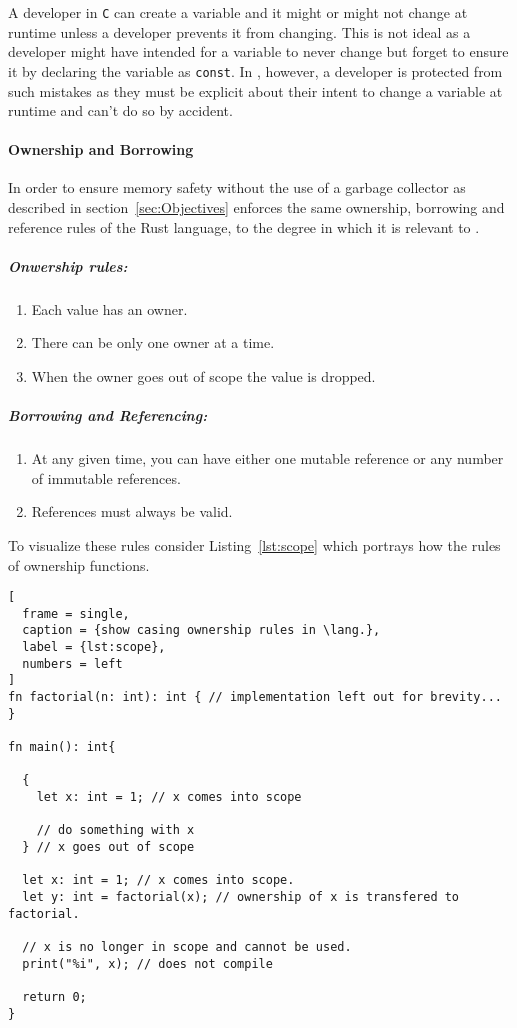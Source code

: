 A developer in \texttt{C} can create a variable and it might or might not change at
runtime unless a developer prevents it from changing. This is not ideal as a
developer might have intended for a variable to never change but forget to ensure it
by declaring the variable as \texttt{const}. In \lang, however, a developer is protected from
such mistakes as they must be explicit about their intent to change a variable at
runtime and can't do so by accident.

\paragraph{Ownership and Borrowing} \hfill 
\label{par:Onwership}

In order to ensure memory safety without the use of a garbage collector as described
in section~\ref{sec:Objectives} \lang{} enforces the same ownership, borrowing and
reference rules of the Rust language, to the degree in which it is relevant to \lang.

\subparagraph{Onwership rules:}
\begin{enumerate}
  \item Each value has an owner\cite{RUST}. 
  \item There can be only one owner at a time\cite{RUST}. 
  \item When the owner goes out of scope the value is dropped\cite{RUST}.
\end{enumerate}

\subparagraph{Borrowing and Referencing:}
\label{par:borrowing}

\begin{enumerate}
  \item At any given time, you can have either one mutable reference or any number of
    immutable references\cite{RUST}.
  \item References must always be valid\cite{RUST}.
\end{enumerate}

To visualize these rules consider Listing~\ref{lst:scope} which portrays how the
rules of ownership functions.

\newpage

\begin{lstlisting}[
  frame = single,
  caption = {show casing ownership rules in \lang.},
  label = {lst:scope},
  numbers = left
]
fn factorial(n: int): int { // implementation left out for brevity... }

fn main(): int{
  
  {
    let x: int = 1; // x comes into scope

    // do something with x
  } // x goes out of scope

  let x: int = 1; // x comes into scope.
  let y: int = factorial(x); // ownership of x is transfered to factorial.

  // x is no longer in scope and cannot be used.
  print("%i", x); // does not compile

  return 0;
}
\end{lstlisting}

